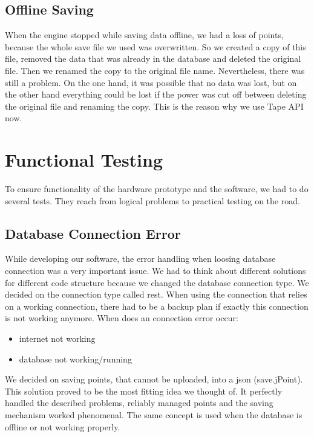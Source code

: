 \subsection{Offline Saving}
When the engine stopped while saving data offline, we had a loss of points, because the whole save file we used was overwritten. So we created a copy of this file, removed the data that was already in the database and deleted the original file. Then we renamed the copy to the original file name. Nevertheless, there was still a problem. On the one hand, it was possible that no data was lost, but on the other hand everything could be lost if the power was cut off between deleting the original file and renaming the copy. This is the reason why we use Tape API now. 
\section{Functional Testing}
To ensure functionality of the hardware prototype and the software, we had to do several tests. They reach from logical problems to practical testing on the road.
\subsection{Database Connection Error}
While developing our software, the error handling when loosing database connection was a very important issue. We had to think about different solutions for different code structure because we changed the database connection type. 
\newline \newline
We decided on the connection type called \gls{rest}. When using the connection that relies on a working connection, there had to be a backup plan if exactly this connection is not working anymore.
\newline \newline
When does an connection error occur:
\begin{itemize}
\item internet not working
\item database not working/running
\end{itemize}
We decided on saving points, that cannot be uploaded, into a \gls{json} (save.jPoint). This solution proved to be the most fitting idea we thought of. It perfectly handled the described problems, reliably managed points and the saving mechanism worked phenomenal.
\newline \newline
The same concept is used when the database is offline or not working properly. 

